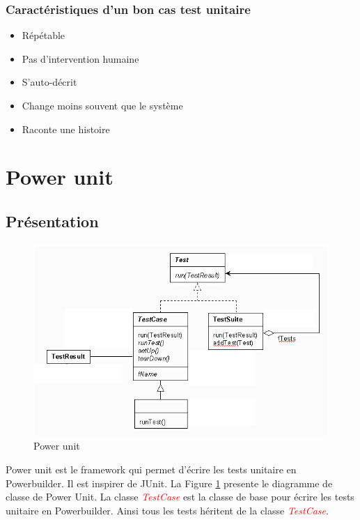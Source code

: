 \documentclass[a4paper,11pt,french]{refart}
\theoremstyle{definition}
\begin{document}
\subsubsection{Caractéristiques d'un bon cas test unitaire}
\begin{itemize}
    \item Répétable
\item Pas d'intervention humaine
\item S'auto-décrit
\item Change moins souvent que le système
\item Raconte une histoire
\end{itemize}
\section{Power unit}
\subsection{Présentation}
 \begin{figure}[!htp]
  \begin{center}
  \includegraphics[width=1\linewidth]{./frameworkPBUnit.png}
  \caption{Power unit}
  \label{fig:powerUnit}
  \end{center}
\end{figure}
Power unit est le framework qui permet d'écrire les tests unitaire en Powerbuilder. Il est inspirer de JUnit.
La Figure \ref{fig:powerUnit} presente le diagramme de classe de Power Unit. La classe \textit{\textcolor{red}{TestCase}} est la classe de base pour écrire les tests unitaire en Powerbuilder.  Ainsi tous les tests héritent de la classe  \textit{\textcolor{red}{TestCase}}. 
\end{document}
